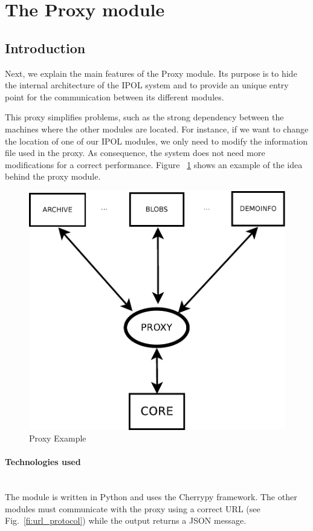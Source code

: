 \section{The Proxy module}

\subsection{Introduction}
\label{sec:proxy_introduction}

Next, we explain the main features of the Proxy module. Its purpose is to hide the internal architecture of the IPOL system and to provide an unique entry point for the communication between its different modules. 

This proxy simplifies problems, such as the strong dependency between the machines where the other modules are located. For instance, if we want to change the location of one of our IPOL modules, we only need to modify the information file used in the proxy. As consequence, the system does not need more modifications for a correct performance. Figure ~\ref{fi:proxy_example} shows an example of the idea behind the proxy module.

\begin{figure}[!ht]
\centering
\includegraphics[width=0.5\columnwidth]{proxy/images/proxy_diagram.pdf}
\caption{Proxy Example} 
\label{fi:proxy_example}
\end{figure}

\paragraph{Technologies used} \hspace{0pt} \\
The module is written in Python and uses the Cherrypy framework. The other modules must communicate with the proxy using a correct URL (see Fig.~\ref{fi:url_protocol}) while the output returns a JSON message.

